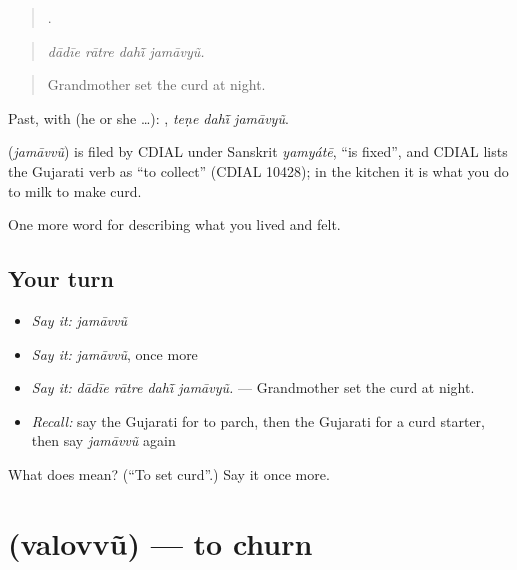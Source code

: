 \begin{quote}
   .
\end{quote}

\begin{quote}
\emph{dādīe rātre dahī̃ jamāvyũ.}
\end{quote}

\begin{quote}
Grandmother set the curd at night.
\end{quote}

Past, with  (he or she …):   , \emph{teṇe dahī̃ jamāvyũ}.

\begin{cousinweb}
\textbf{} (\emph{jamāvvũ}) is filed by CDIAL under Sanskrit \emph{yamyátē}, \textquotedblleft{}is fixed\textquotedblright{}, and CDIAL lists the Gujarati verb as \textquotedblleft{}to collect\textquotedblright{} (CDIAL 10428); in the kitchen it is what you do to milk to make curd.
\end{cousinweb}

\begin{grammarlens}[title={What you've built}]
One more word for describing what you lived and felt.
\end{grammarlens}

\subsection*{Your turn}
\begin{itemize}
\raggedright
  \item \emph{Say it:} \emph{jamāvvũ}
  \item \emph{Say it:} \emph{jamāvvũ}, once more
  \item \emph{Say it:} \emph{dādīe rātre dahī̃ jamāvyũ.} — Grandmother set the curd at night.
  \item \emph{Recall:} say the Gujarati for to parch, then the Gujarati for a curd starter, then say \emph{jamāvvũ} again
\end{itemize}

\begin{tcolorbox}[breakable,colback=teal!4,colframe=teal!35!black,title={Before you move on}]
What does  mean? (\textquotedblleft{}To set curd\textquotedblright{}.) Say it once more.
\end{tcolorbox}
\section[\texorpdfstring{\gu{વલોવવું} (valovvũ)}{વલોવવું (valovvũ)}]{ (valovvũ) — to churn}

